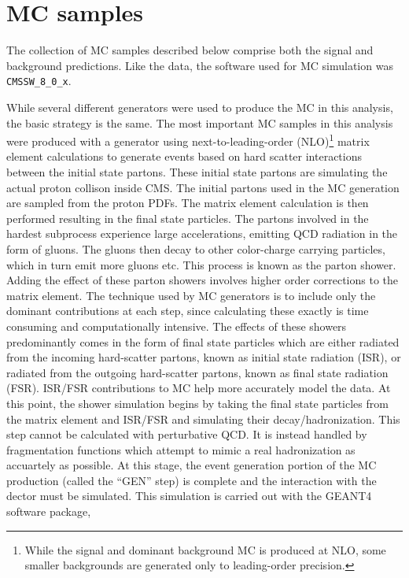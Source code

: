\section{MC samples}
The collection of MC samples described below comprise both the signal and background predictions. 
Like the data, the software used for MC simulation was \texttt{CMSSW\_8\_0\_x}.

While several different generators were used to produce the MC in this analysis, the basic strategy is the same.
The most important MC samples in this analysis were produced with a generator using next-to-leading-order (NLO)\footnote{While the signal and dominant background MC is produced
at NLO, some smaller backgrounds are generated only to leading-order precision.}
matrix element calculations to generate events based on hard scatter
interactions between the initial state partons. These initial state partons are simulating the
actual proton collison inside CMS. The initial partons used in the MC generation are sampled from the proton PDFs.
The matrix element calculation is then performed resulting in the final state particles.
The partons involved in the hardest subprocess experience large accelerations, emitting QCD radiation in the form of gluons. The gluons then decay to other
color-charge carrying particles, which in turn emit more gluons etc. This process is known as the parton shower. Adding the effect of these parton showers involves
higher order corrections to the matrix element. The technique used by MC generators is to include only the dominant contributions at each step,
since calculating these exactly is time consuming and computationally intensive. The effects of these showers predominantly comes in the form of
final state particles which are either radiated from the incoming hard-scatter partons, known as initial state radiation (ISR), or radiated from
the outgoing hard-scatter partons, known as final state radiation (FSR). ISR/FSR contributions to MC help more accurately model the data.
At this point, the shower simulation begins by taking the final state particles from the matrix element and ISR/FSR and simulating their decay/hadronization. This step
cannot be calculated with perturbative QCD. It is instead handled by fragmentation functions which attempt to mimic a real
hadronization as accuartely as possible. At this stage, the event generation portion of the MC production (called the ``GEN'' step)
is complete and the interaction with the dector must be simulated. This simulation is carried out with the GEANT4 software package,
